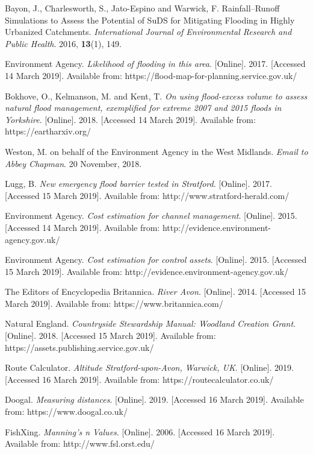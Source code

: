 \documentclass[11pt,a4paper]{article}
\begin{document}
\begin{thebibliography}{}
Bayon, J., Charlesworth, S., Jato-Espino and Warwick, F. Rainfall–Runoff Simulations to Assess the Potential of SuDS for Mitigating Flooding in Highly Urbanized Catchments. \textit{International Journal of Environmental Research and Public Health}. 2016, \textbf{13}(1), 149.

Environment Agency. \textit{Likelihood of flooding in this area}. [Online]. 2017. [Accessed 14 March 2019]. Available from: https://flood-map-for-planning.service.gov.uk/

Bokhove, O., Kelmanson, M. and Kent, T. \textit{On using flood-excess volume to assess natural flood management, exemplified for extreme 2007 and 2015 floods in Yorkshire}. [Online]. 2018. [Accessed 14 March 2019]. Available from: https://eartharxiv.org/

Weston, M. on behalf of the Environment Agency in the West Midlands. \textit{Email to Abbey Chapman}. 20 November, 2018.

Lugg, B. \textit{New emergency flood barrier tested in Stratford}. [Online]. 2017. [Accessed 15 March 2019]. Available from: http://www.stratford-herald.com/

Environment Agency. \textit{Cost estimation for channel management}. [Online]. 2015. [Accessed 14 March 2019]. Available from: http://evidence.environment-agency.gov.uk/

Environment Agency. \textit{Cost estimation for control assets}. [Online]. 2015. [Accessed 15 March 2019]. Available from: http://evidence.environment-agency.gov.uk/

The Editors of Encyclopedia Britannica. \textit{River Avon}. [Online]. 2014. [Accessed 15 March 2019]. Available from:  https://www.britannica.com/

Natural England. \textit{Countryside Stewardship Manual: Woodland Creation Grant}. [Online]. 2018. [Accessed 15 March 2019]. Available from: https://assets.publishing.service.gov.uk/

Route Calculator. \textit{Altitude Stratford-upon-Avon, Warwick, UK}. [Online]. 2019. [Accessed 16 March 2019]. Available from: https://routecalculator.co.uk/

Doogal. \textit{Measuring distances}. [Online]. 2019. [Accessed 16 March 2019]. Available from: https://www.doogal.co.uk/

FishXing. \textit{Manning's n Values}. [Online]. 2006. [Accessed 16 March 2019]. Available from: http://www.fsl.orst.edu/


\end{thebibliography}
\end{document}
